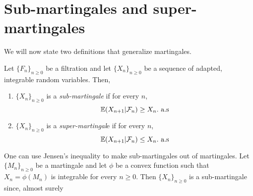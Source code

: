 \section{Sub-martingales and super-martingales}
We will now state two definitions that generalize martingales.
\begin{definition}
    Let $\{F_n\}_{n \ge 0}$ be a filtration and let $\{X_n\}_{n \ge 0}$ be a sequence of adapted, integrable random variables. Then,
    \begin{enumerate}
        \item $\{X_n\}_{n \ge 0}$ is a \emph{sub-martingale} if for every $n$, \[{\mathbb{E}}(X_{n+1}|{\mathcal{F}}_n) \ge X_n.~\text{a.s}\]
        \item $\{X_n\}_{n \ge 0}$ is a \emph{super-martingal}e if for every $n$, \[{\mathbb{E}}(X_{n+1}|{\mathcal{F}}_n) \le X_n.~\text{a.s}\]
    \end{enumerate}
\end{definition}
\begin{remark}
    One can use Jensen's inequality to make sub-martingales out of martingales. Let $\{M_n\}_{n \ge 0}$ be a martingale and let $\phi$ be a convex function such that $X_n = \phi(M_n)$ is integrable for every $n \ge 0$. Then $\{X_n\}_{n \ge 0}$ is a sub-martingale since, almost surely
\end{remark}

